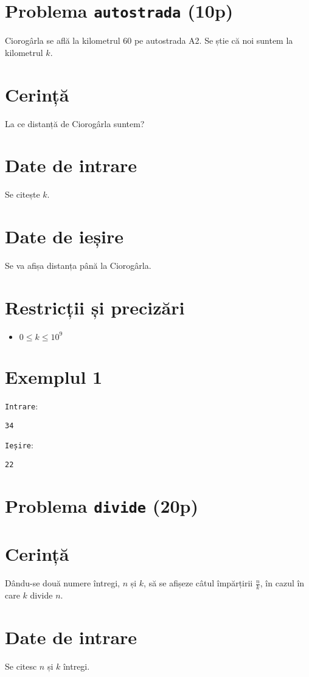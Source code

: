 \documentclass{scrartcl}
\author{Test Tutors of CNMB Informatică}
\date{\today}
\begin{document}
\section*{Problema \texttt{autostrada} (10p)}
Ciorogârla se află la kilometrul 60 pe autostrada A2. Se știe că noi suntem la kilometrul $k$.
\section*{Cerință}
La ce distanță de Ciorogârla suntem?
\section*{Date de intrare}
Se citește $k$.
\section*{Date de ieșire}
Se va afișa distanța până la Ciorogârla.
\section*{Restricții și precizări}
\begin{itemize}
    \item $0 \leq k \leq 10^9$
\end{itemize}

{
\parindent0pt
    
\section*{Exemplul 1}
\texttt{Intrare}:
    \begin{lstlisting}
34
    \end{lstlisting}

\texttt{Ieșire}:
    \begin{lstlisting}
22
    \end{lstlisting}

}

\pagebreak

\section*{Problema \texttt{divide} (20p)}
\section*{Cerință}
Dându-se două numere întregi, $n$ și $k$, să se afișeze câtul împărțirii $\frac{n}{k}$, în cazul în care $k$ divide $n$.
\section*{Date de intrare}
Se citesc $n$ și $k$ întregi.
\end{document}

